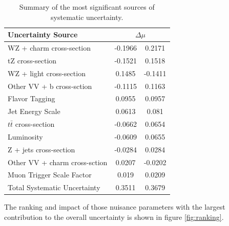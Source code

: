 \documentclass[NOTE, atlasdraft=true, texlive=2016, UKenglish]{\ATLASLATEXPATH atlasdoc}
\begin{document}
\begin{table}[H]
    \centering
    \begin{tabular}{l|cc}
        \hline\hline
        Uncertainty Source & \multicolumn{2}{c}{$\Delta \mu$ }  \\
        \hline
        WZ + charm cross-section & -0.1966 & 0.2171 \\
        tZ cross-section & -0.1521 & 0.1518 \\
        WZ + light cross-section & 0.1485 & -0.1411 \\
        Other VV + b cross-sction & -0.1115 & 0.1163 \\
        Flavor Tagging & 0.0955 & 0.0957 \\
        Jet Energy Scale & 0.0613 & 0.081 \\
        $t\bar{t}$ cross-section & -0.0662 & 0.0654 \\
        Luminosity & -0.0609 & 0.0655 \\
        Z + jets cross-section & -0.0284 & 0.0284 \\
        Other VV + charm cross-sction & 0.0207 & -0.0202 \\
        Muon Trigger Scale Factor & 0.019 & 0.0209 \\
        \hline
        Total Systematic Uncertainty & 0.3511 & 0.3679 \\
        \hline\hline
    \end{tabular}
    \caption{Summary of the most significant sources of systematic uncertainty.}
    \label{tab:systematics}
\end{table}

The ranking and impact of those nuisance parameters with the largest contribution to the overall uncertainty is shown in figure \ref{fig:ranking}.
\end{document}

